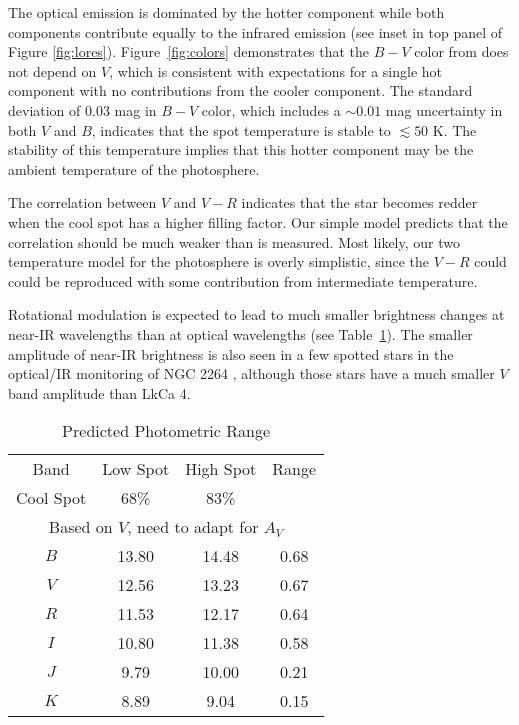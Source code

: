\documentclass[twocolumn]{emulateapj}%
\begin{document}
The optical emission is dominated by the hotter component while both components contribute equally to the infrared emission (see inset in top panel of Figure \ref{fig:lores}).  Figure~\ref{fig:colors} demonstrates that the $B-V$ color from \citet{grankin08} does not depend on $V$, which is consistent with expectations for a single hot component with no contributions from the cooler component.  The standard deviation of 0.03 mag in $B-V$ color, which includes a $\sim 0.01$ mag uncertainty in both $V$ and $B$, indicates that the spot temperature is stable to $\lesssim 50$ K.  The stability of this temperature implies that this hotter component may be the ambient temperature of the photosphere.

The correlation between $V$ and $V-R$ indicates that the star becomes redder when the cool spot has a higher filling factor.  Our simple model predicts that the correlation should be much weaker than is measured.  Most likely, our two temperature model for the photosphere is overly simplistic, since the $V-R$ could could be reproduced with some contribution from intermediate temperature.

Rotational modulation is expected to lead to much smaller brightness changes at near-IR wavelengths than at optical wavelengths (see Table~\ref{tab:photrange}).  The smaller amplitude of near-IR brightness is also seen in a few spotted stars in the optical/IR monitoring of NGC 2264 \citep{cody14}, although those stars have a much smaller $V$ band amplitude than LkCa 4.







\begin{table}
\caption{Predicted Photometric Range}
\centering
\label{tab:photrange}
\begin{tabular}{cccc}
\hline
Band & Low Spot & High Spot & Range\\
Cool Spot & 68\% & 83\% &\\
\hline
\multicolumn{4}{c}{Based on $V$, need to adapt for $A_V$}\\
$B$ & 13.80 & 14.48 & 0.68\\
$V$ & 12.56 & 13.23 & 0.67\\
$R$ & 11.53 & 12.17 & 0.64 \\
$I$ & 10.80 & 11.38 & 0.58\\
$J$ & 9.79 & 10.00 & 0.21\\
$K$ & 8.89 & 9.04 & 0.15\\
\hline
\end{tabular}
\end{table}
\end{document}
